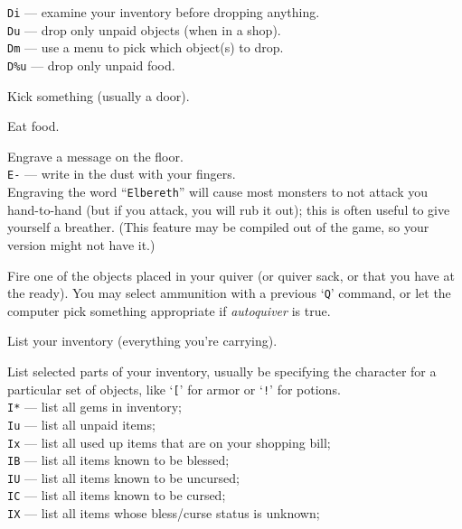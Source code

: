 {\tt Di}  --- examine your inventory before dropping anything.\\
{\tt Du}  --- drop only unpaid objects (when in a shop).\\
{\tt Dm}  --- use a menu to pick which object(s) to drop.\\
{\tt D\%u} --- drop only unpaid food.
\item[\tb{\^{}D}]
Kick something (usually a door).
\item[\tb{e}]
Eat food.
\item[\tb{E}]
Engrave a message on the floor.\\
{\tt E-} --- write in the dust with your fingers.\\
Engraving the word ``{\tt Elbereth}'' will cause most monsters to not attack
you hand-to-hand (but if you attack, you will rub it out); this is
often useful to give yourself a breather.  (This feature may be compiled out
of the game, so your version might not have it.)
\item[\tb{f}]
Fire one of the objects placed in your quiver (or quiver sack, or that you
have at the ready).  You may select
ammunition with a previous `{\tt Q}' command, or let the computer pick
something appropriate if {\it autoquiver\/} is true.
\item[\tb{i}]
List your inventory (everything you're carrying).
\item[\tb{I}]
List selected parts of your inventory, usually be specifying the character
for a particular set of objects, like `{\tt [}' for armor or `{\tt !}'
for potions.\\
{\tt I*} --- list all gems in inventory;\\
{\tt Iu} --- list all unpaid items;\\
{\tt Ix} --- list all used up items that are on your shopping bill;\\
{\tt IB} --- list all items known to be blessed;\\
{\tt IU} --- list all items known to be uncursed;\\
{\tt IC} --- list all items known to be cursed;\\
{\tt IX} --- list all items whose bless/curse status is unknown;\\
